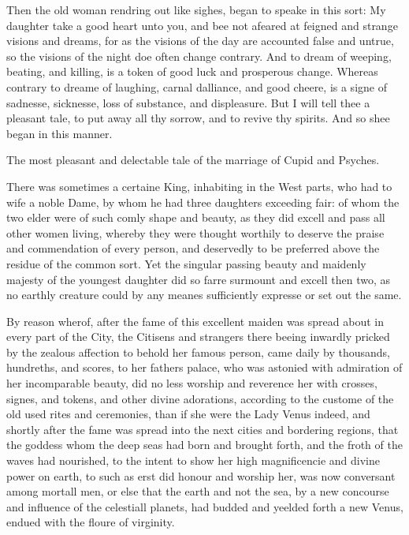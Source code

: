 Then the old woman rendring out like sighes, began to speake in this sort: My
daughter take a good heart unto you, and bee not afeared at feigned and strange
visions and dreams, for as the visions of the day are accounted false and
untrue, so the visions of the night doe often change contrary. And to dream of
weeping, beating, and killing, is a token of good luck and prosperous change.
Whereas contrary to dreame of laughing, carnal dalliance, and good cheere, is a
signe of sadnesse, sicknesse, loss of substance, and displeasure. But I will
tell thee a pleasant tale, to put away all thy sorrow, and to revive thy
spirits. And so shee began in this manner.



The most pleasant and delectable tale of the marriage of Cupid and Psyches.

There was sometimes a certaine King, inhabiting in the West parts, who had to
wife a noble Dame, by whom he had three daughters exceeding fair: of whom the
two elder were of such comly shape and beauty, as they did excell and pass all
other women living, whereby they were thought worthily to deserve the praise
and commendation of every person, and deservedly to be preferred above the
residue of the common sort. Yet the singular passing beauty and maidenly
majesty of the youngest daughter did so farre surmount and excell then two, as
no earthly creature could by any meanes sufficiently expresse or set out the
same.

By reason wherof, after the fame of this excellent maiden was spread about in
every part of the City, the Citisens and strangers there beeing inwardly
pricked by the zealous affection to behold her famous person, came daily by
thousands, hundreths, and scores, to her fathers palace, who was astonied with
admiration of her incomparable beauty, did no less worship and reverence her
with crosses, signes, and tokens, and other divine adorations, according to the
custome of the old used rites and ceremonies, than if she were the Lady Venus
indeed, and shortly after the fame was spread into the next cities and
bordering regions, that the goddess whom the deep seas had born and brought
forth, and the froth of the waves had nourished, to the intent to show her high
magnificencie and divine power on earth, to such as erst did honour and worship
her, was now conversant among mortall men, or else that the earth and not the
sea, by a new concourse and influence of the celestiall planets, had budded and
yeelded forth a new Venus, endued with the floure of virginity.

